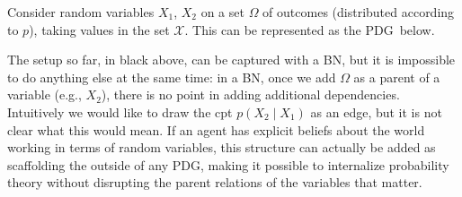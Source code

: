 \documentclass{article}
\newcommand{\MN}{PDG}
\numberwithin{equation}{section}
\begin{document}
	\begin{example}\label{ex:randomvars}
		Consider random variables $X_1$, $X_2$  on a set $\Omega$ of outcomes (distributed according to $p$), taking values in the set $\mathcal X$. This can be represented as the \MN\ below.
		\begin{center}
		\end{center}
		The setup so far, in black above, can be captured with a BN, but it is impossible to do anything else at the same time: in a BN, once we add $\Omega$ as a parent of a variable (e.g., $X_2$), there is no point in adding additional dependencies. Intuitively we would like to draw the cpt $p(X_2 \mid X_1)$ as an edge, but it is not clear what this would mean.		
		If an agent has explicit beliefs about the world working in terms of random variables, this structure can actually be added as scaffolding the outside of any \MN, making it possible to internalize probability theory without disrupting the parent relations of the variables that matter.
	\end{example}

\end{document}

